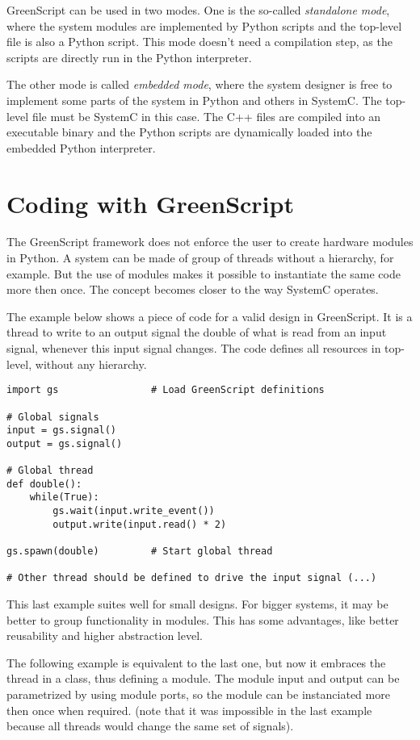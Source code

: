 \documentclass[12pt,oneside]{gsbook}
\begin{document}
GreenScript can be used in two modes. One is the so-called
\textit{standalone mode}, where the system modules are implemented by
Python scripts and the top-level file is also a Python script. This
mode doesn't need a compilation step, as the scripts are directly run
in the Python interpreter.

The other mode is called \textit{embedded mode}, where the system
designer is free to implement some parts of the system in Python and
others in SystemC. The top-level file must be SystemC in this
case. The C++ files are compiled into an executable binary and the
Python scripts are dynamically loaded into the embedded Python
interpreter.

\section{Coding with GreenScript}

The GreenScript framework does not enforce the user to create hardware
modules in Python. A system can be made of group of threads without a
hierarchy, for example. But the use of modules makes it possible to
instantiate the same code more then once. The concept becomes closer
to the way SystemC operates.

The example below shows a piece of code for a valid design in
GreenScript. It is a thread to write to an output signal the double of
what is read from an input signal, whenever this input signal
changes. The code defines all resources in top-level, without any
hierarchy.

\begin{lstlisting}
import gs                # Load GreenScript definitions

# Global signals
input = gs.signal()
output = gs.signal()

# Global thread
def double():
    while(True):
        gs.wait(input.write_event())
        output.write(input.read() * 2)

gs.spawn(double)         # Start global thread

# Other thread should be defined to drive the input signal (...)
\end{lstlisting}

This last example suites well for small designs. For bigger systems,
it may be better to group functionality in modules. This has some
advantages, like better reusability and higher abstraction level.

The following example is equivalent to the last one, but now it
embraces the thread in a class, thus defining a module. The module
input and output can be parametrized by using module ports, so the
module can be instanciated more then once when required. (note that it
was impossible in the last example because all threads would change
the same set of signals).
\end{document}
